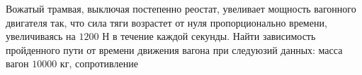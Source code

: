 Вожатый трамвая, выключая постепенно реостат, увеливает
мощность вагонного двигателя так, что сила тяги возрастет от нуля
пропорционально времени, увеличиваясь на $1200$ Н в течение каждой
секунды. Найти зависимость пройденного пути от времени движения вагона
при следуюзий данных: масса вагон $10 000$ кг, сопротивление
